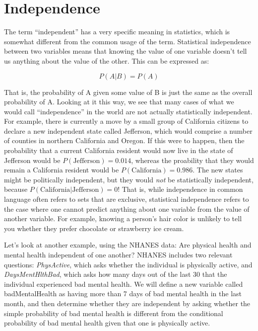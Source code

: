 \documentclass[]{book}
\theoremstyle{definition}
\theoremstyle{definition}
\theoremstyle{definition}
\theoremstyle{remark}
\begin{document}
\section{Independence}\label{independence}

The term ``independent'' has a very specific meaning in statistics,
which is somewhat different from the common usage of the term.
Statistical independence between two variables means that knowing the
value of one variable doesn't tell us anything about the value of the
other. This can be expressed as:

\[
P(A|B) = P(A)
\]

That is, the probability of A given some value of B is just the same as
the overall probability of A. Looking at it this way, we see that many
cases of what we would call ``independence'' in the world are not
actually statistically independent. For example, there is currently a
move by a small group of California citizens to declare a new
independent state called Jefferson, which would comprise a number of
counties in northern California and Oregon. If this were to happen, then
the probability that a current California resident would now live in the
state of Jefferson would be \(P(\text{Jefferson})=0.014\), whereas the
proability that they would remain a California resident would be
\(P(\text{California})=0.986\). The new states might be politically
independent, but they would \emph{not} be statistically independent,
because \(P(\text{California|Jefferson}) = 0\)! That is, while
independence in common language often refers to sets that are exclusive,
statistical independence refers to the case where one cannot predict
anything about one variable from the value of another variable. For
example, knowing a person's hair color is unlikely to tell you whether
they prefer chocolate or strawberry ice cream.

Let's look at another example, using the NHANES data: Are physical
health and mental health independent of one another? NHANES includes two
relevant questions: \emph{PhysActive}, which asks whether the individual
is physically active, and \emph{DaysMentHlthBad}, which asks how many
days out of the last 30 that the individual experienced bad mental
health. We will define a new variable called badMentalHealth as having
more than 7 days of bad mental health in the last month, and then
determine whether they are independent by asking whether the simple
probability of bad mental health is different from the conditional
probability of bad mental health given that one is physically active.
\end{document}
